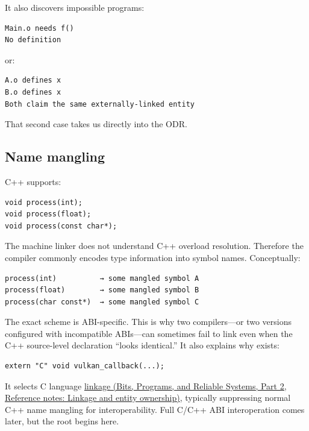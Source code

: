 It also discovers impossible programs:

\begin{verbatim}
Main.o needs f()
No definition
\end{verbatim}

or:

\begin{verbatim}
A.o defines x
B.o defines x
Both claim the same externally-linked entity
\end{verbatim}

That second case takes us directly into the ODR.

\subsection{Name mangling}\label{05-engine-i-ch002-name-mangling}

\hypertarget{05-engine-i-ch002-name-mangling}{}

C++ supports:

\begin{verbatim}
void process(int);
void process(float);
void process(const char*);
\end{verbatim}

The machine linker does not understand C++ overload resolution. Therefore the compiler commonly encodes type information into symbol names. Conceptually:

\begin{verbatim}
process(int)          → some mangled symbol A
process(float)        → some mangled symbol B
process(char const*)  → some mangled symbol C
\end{verbatim}

The exact scheme is ABI-specific. This is why two compilers---or two versions configured with incompatible ABIs---can sometimes fail to link even when the C++ source-level declaration ``looks identical.'' It also explains why  exists:

\begin{verbatim}
extern "C" void vulkan_callback(...);
\end{verbatim}

It selects C language \href{../01-Bits-Programs-and-Reliable-Systems-P02/main.pdf\#nameddest=appendix-74a0ec818c18}{linkage (Bits, Programs, and Reliable Systems, Part 2, Reference notes: Linkage and entity ownership)}, typically suppressing normal C++ name mangling for interoperability. Full C/C++ ABI interoperation comes later, but the root begins here.

